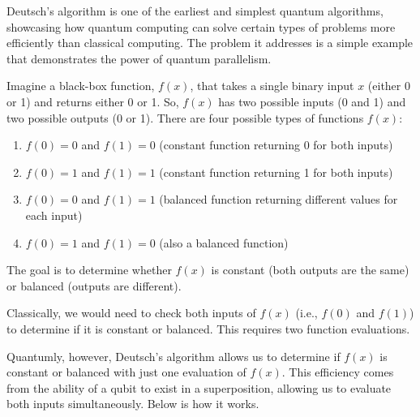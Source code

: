 \documentclass{article}
\begin{document}
		Deutsch's algorithm is one of the earliest and simplest quantum algorithms, showcasing how quantum computing can solve certain types of problems more efficiently than classical computing. The problem it addresses is a simple example that demonstrates the power of quantum parallelism.
		
		Imagine a black-box function, \( f(x) \), that takes a single binary input \( x \) (either 0 or 1) and returns either 0 or 1. So, \( f(x) \) has two possible inputs (0 and 1) and two possible outputs (0 or 1). There are four possible types of functions \( f(x) \):
		
		\begin{enumerate}
			\item \( f(0) = 0 \) and \( f(1) = 0 \) (constant function returning 0 for both inputs)
			\item \( f(0) = 1 \) and \( f(1) = 1 \) (constant function returning 1 for both inputs)
			\item \( f(0) = 0 \) and \( f(1) = 1 \) (balanced function returning different values for each input)
			\item \( f(0) = 1 \) and \( f(1) = 0 \) (also a balanced function)
		\end{enumerate}
		
		The goal is to determine whether \( f(x) \) is constant (both outputs are the same) or balanced (outputs are different).
		
		Classically, we would need to check both inputs of \( f(x) \) (i.e., \( f(0) \) and \( f(1) \)) to determine if it is constant or balanced. This requires two function evaluations.
		
		Quantumly, however, Deutsch’s algorithm allows us to determine if \( f(x) \) is constant or balanced with just one evaluation of \( f(x) \). This efficiency comes from the ability of a qubit to exist in a superposition, allowing us to evaluate both inputs simultaneously.
		Below is how it works.
		
\end{document}
